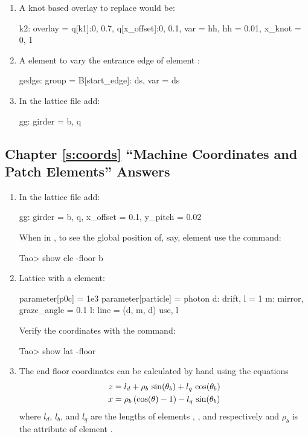\documentclass{hitec}     %
\begin{document}
\begin{enumerate}[label=\ref*{s:control}.\arabic{enumi}]
\item
A knot based overlay to replace  would be:
\begin{code}
k2: overlay = {q[k1]:{0, 0.7}, q[x_offset]:{0, 0.1}}, 
                      var = {hh}, hh = 0.01, x_knot = {0, 1}
\end{code}
%
\item
A  element to vary the entrance edge of element :
\begin{code}
gedge: group = {B[start_edge]: ds}, var = {ds}
\end{code}
%
\item
In the  lattice file add:
\begin{code}
gg: girder = {b, q}
\end{code}
\end{enumerate}

\subsection[Chapter \ref*{s:coords.ex} ``Machine Coordinates and Patch Elements'']{Chapter \hyperref[s:coords.ex]{\ref*{s:coords}} ``Machine Coordinates and Patch Elements'' Answers}
\label{s:ans.coords}

\begin{enumerate}[label=\ref*{s:coords}.\arabic{enumi}]
\item
In the  lattice file add:
\begin{code}
gg: girder = {b, q}, x_offset = 0.1, y_pitch = 0.02
\end{code}
When in \tao, to see the global position of, say, element  use the command:
\begin{code}
Tao> show ele -floor b
\end{code}
%
\item
Lattice with a  element:
\begin{code}
parameter[p0c] = 1e3
parameter[particle] = photon
d: drift, l = 1
m: mirror, graze_angle = 0.1
l: line = (d, m, d)
use, l
\end{code}
Verify the coordinates with the command:
\begin{code}
Tao> show lat -floor
\end{code}
%
\item
The end floor coordinates can be calculated by hand using the equations
\begin{align}
  z &= l_d + \rho_b \, \sin(\theta_b) + l_q \, \cos(\theta_b) \nonumber \\
  x &= \rho_b \, (\cos(\theta) - 1) - l_q \, \sin(\theta_b)
\end{align}
where $l_d$, $l_b$, and $l_q$ are the lengths of elements , , and  respectively
and $\rho_b$ is the  attribute of element .
\end{enumerate}
\end{document}
